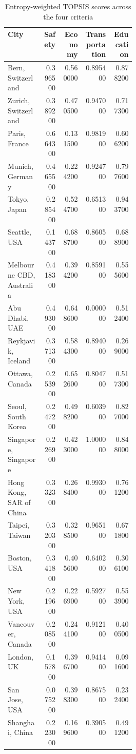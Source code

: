 \documentclass[11pt,letterpaper]{article}
\begin{document}
\begingroup
\setlength{\LTleft}{\fill}
\setlength{\LTright}{\fill}
\renewcommand{\thetable}{6.2}
\footnotesize
\setlength{\tabcolsep}{3pt}
\begin{longtable}{@{}p{0.29\linewidth}rrrr@{}}
\caption{Entropy-weighted TOPSIS scores across the four criteria}\\
\toprule
\textbf{City} & \textbf{Safety} & \textbf{Economy} & \textbf{Transportation} & \textbf{Education} \\
\midrule
Bern, Switzerland & 0.396500 & 0.560000 & 0.895400 & 0.878200 \\
Zurich, Switzerland & 0.389200 & 0.470500 & 0.947000 & 0.717300 \\
Paris, France & 0.664300 & 0.131500 & 0.981900 & 0.606200 \\
Munich, Germany & 0.465500 & 0.224200 & 0.924700 & 0.797600 \\
Tokyo, Japan & 0.285400 & 0.524700 & 0.651300 & 0.943700 \\
Seattle, USA & 0.143700 & 0.688700 & 0.860500 & 0.688900 \\
Melbourne CBD, Australia & 0.418300 & 0.394200 & 0.859100 & 0.555600 \\
Abu Dhabi, UAE & 0.493000 & 0.648600 & 0.000000 & 0.512400 \\
Reykjavik, Iceland & 0.371300 & 0.584300 & 0.894000 & 0.269000 \\
Ottawa, Canada & 0.253900 & 0.652600 & 0.804700 & 0.517300 \\
Seoul, South Korea & 0.247200 & 0.498200 & 0.603900 & 0.827000 \\
Singapore, Singapore & 0.226900 & 0.423000 & 1.000000 & 0.848000 \\
Hong Kong, SAR of China & 0.332300 & 0.268400 & 0.993000 & 0.761200 \\
Taipei, Taiwan & 0.320300 & 0.328500 & 0.965100 & 0.671800 \\
Boston, USA & 0.341800 & 0.405600 & 0.640200 & 0.306100 \\
New York, USA & 0.219600 & 0.226900 & 0.592700 & 0.553900 \\
Vancouver, Canada & 0.208500 & 0.244100 & 0.912100 & 0.400500 \\
London, UK & 0.157800 & 0.396700 & 0.941400 & 0.091600 \\
San Jose, USA & 0.075200 & 0.398300 & 0.867500 & 0.232400 \\
Shanghai, China & 0.223000 & 0.169600 & 0.390500 & 0.491200 \\
\bottomrule
\end{longtable}
\endgroup
\end{document}
